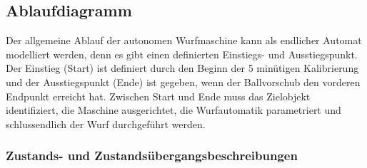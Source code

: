 \subsection{Ablaufdiagramm}
\label{ss_ablaufdiagramm}

Der allgemeine Ablauf der autonomen Wurfmaschine kann als endlicher Automat
modelliert werden, denn es gibt einen definierten Einstiegs- und 
Ausstiegspunkt. Der Einstieg (Start) ist definiert durch den Beginn der 5 minütigen Kalibrierung und der Ausstiegspunkt (Ende) ist gegeben, wenn der Ballvorschub den vorderen Endpunkt erreicht hat. Zwischen Start und Ende muss das Zielobjekt
identifiziert, die Maschine ausgerichtet, die Wurfautomatik
parametriert und schlussendlich der Wurf durchgeführt werden.



\subsubsection{Zustands- und Zustandsübergangsbeschreibungen}
